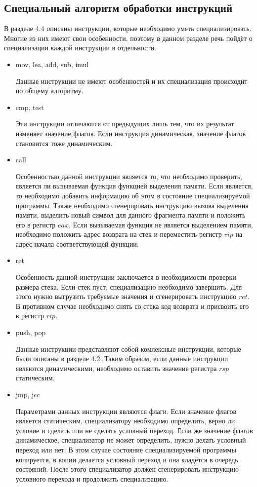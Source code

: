 \documentclass{spbau-diploma}
\begin{document}
\subsection{Специальный алгоритм обработки инструкций}
В разделе 4.4 описаны инструкции, которые необходимо уметь специализировать. Многие из них имеют свои особенности, поэтому в данном разделе речь пойдёт о специализации каждой инструкции в отдельности.
\begin{itemize}
\item{mov, lea, add, sub, imul}

Данные инструкции не имеют особенностей и их специализация происходит по общему алгоритму.
\item{cmp, test}

Эти инструкции отличаются от предыдущих лишь тем, что их результат изменяет значение флагов. Если инструкция динамическая, значение флагов становится тоже динамическим.
\item{call}

Особенностью данной инструкции является то, что необходимо проверить, является ли вызываемая функция функцией выделения памяти. Если является, то необходимо добавить информацию об этом в состояние специализируемой программы. Также необходимо сгенерировать инструкцию вызова выделения памяти, выделить новый символ для данного фрагмента памяти и положить его в регистр $eax$. Если вызываемая функция не является выделением памяти, необходимо положить адрес возврата на стек и переместить регистр $rip$ на адрес начала соответствующей функции.
\item{ret}

Особенность данной инструкции заключается в необходимости проверки размера стека. Если стек пуст, специализацию необходимо завершить. Для этого нужно выгрузить требуемые значения и сгенерировать инструкцию $ret$. В противном случае необходимо снять со стека код возврата и присвоить его в регистр $rip$.
\item{push, pop}

Данные инструкции представляют собой комлексные инструкции, которые были описаны в разделе 4.2. Таким образом, если данные инструкции являются динамическими, необходимо оставить значение регистра $rsp$ статическим.
\item{jmp, jcc}

Параметрами данных инструкции являются флаги. Если значение флагов является статическим, специализатору необходимо определить, верно ли условие и сделать или не сделать условный переход. Если же значение флагов динамическое, специализатор не может определить, нужно делать условный переход или нет. В этом случае состояние специализируемой программы копируется, в копии делается условный переход и она кладётся в очередь состояний. После этого специализатор должен сгенерировать инструкцию условного перехода и продолжить специализацию.
\end{itemize}
\end{document}
